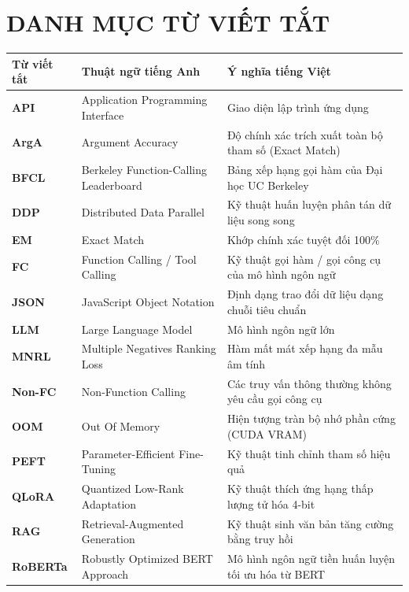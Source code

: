 \chapter*{DANH MỤC TỪ VIẾT TẮT}

\begin{table}[htbp]
    \centering
    \begin{tabular}{lll}
        \toprule
        \textbf{Từ viết tắt} & \textbf{Thuật ngữ tiếng Anh} & \textbf{Ý nghĩa tiếng Việt} \\
        \midrule
        \textbf{API} & Application Programming Interface & Giao diện lập trình ứng dụng \\
        \textbf{ArgA} & Argument Accuracy & Độ chính xác trích xuất toàn bộ tham số (Exact Match) \\
        \textbf{BFCL} & Berkeley Function-Calling Leaderboard & Bảng xếp hạng gọi hàm của Đại học UC Berkeley \\
        \textbf{DDP} & Distributed Data Parallel & Kỹ thuật huấn luyện phân tán dữ liệu song song \\
        \textbf{EM} & Exact Match & Khớp chính xác tuyệt đối 100\% \\
        \textbf{FC} & Function Calling / Tool Calling & Kỹ thuật gọi hàm / gọi công cụ của mô hình ngôn ngữ \\
        \textbf{JSON} & JavaScript Object Notation & Định dạng trao đổi dữ liệu dạng chuỗi tiêu chuẩn \\
        \textbf{LLM} & Large Language Model & Mô hình ngôn ngữ lớn \\
        \textbf{MNRL} & Multiple Negatives Ranking Loss & Hàm mất mát xếp hạng đa mẫu âm tính \\
        \textbf{Non-FC} & Non-Function Calling & Các truy vấn thông thường không yêu cầu gọi công cụ \\
        \textbf{OOM} & Out Of Memory & Hiện tượng tràn bộ nhớ phần cứng (CUDA VRAM) \\
        \textbf{PEFT} & Parameter-Efficient Fine-Tuning & Kỹ thuật tinh chỉnh tham số hiệu quả \\
        \textbf{QLoRA} & Quantized Low-Rank Adaptation & Kỹ thuật thích ứng hạng thấp lượng tử hóa 4-bit \\
        \textbf{RAG} & Retrieval-Augmented Generation & Kỹ thuật sinh văn bản tăng cường bằng truy hồi \\
        \textbf{RoBERTa} & Robustly Optimized BERT Approach & Mô hình ngôn ngữ tiền huấn luyện tối ưu hóa từ BERT \\

\end{tabular}
\end{table}
